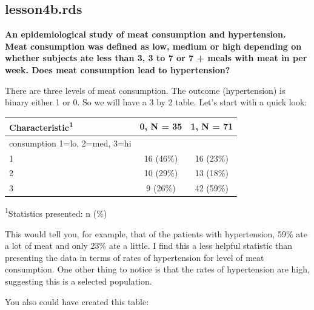 \documentclass[]{book}
\newenvironment{Shaded}{\begin{snugshade}}{\end{snugshade}}
\newcommand{\DataTypeTok}[1]{\textcolor[rgb]{0.13,0.29,0.53}{#1}}
\newcommand{\KeywordTok}[1]{\textcolor[rgb]{0.13,0.29,0.53}{\textbf{#1}}}
\newcommand{\NormalTok}[1]{#1}
\newcommand{\OperatorTok}[1]{\textcolor[rgb]{0.81,0.36,0.00}{\textbf{#1}}}
\newcommand{\StringTok}[1]{\textcolor[rgb]{0.31,0.60,0.02}{#1}}
\begin{document}
\hypertarget{lesson4b.rds}{%
\subsection{lesson4b.rds}\label{lesson4b.rds}}

\textbf{An epidemiological study of meat consumption and hypertension. Meat consumption was defined as low, medium or high depending on whether subjects ate less than 3, 3 to 7 or 7 + meals with meat in per week. Does meat consumption lead to hypertension?}

There are three levels of meat consumption. The outcome (hypertension) is binary either 1 or 0. So we will have a 3 by 2 table. Let's start with a quick look:

\begin{Shaded}
\end{Shaded}

\captionsetup[table]{labelformat=empty,skip=1pt}
\begin{longtable}{lcc}
\toprule
\textbf{Characteristic}\textsuperscript{1} & \textbf{0}, N = 35 & \textbf{1}, N = 71 \\ 
\midrule
consumption 1=lo, 2=med, 3=hi &  &  \\ 
1 & 16 (46\%) & 16 (23\%) \\ 
2 & 10 (29\%) & 13 (18\%) \\ 
3 & 9 (26\%) & 42 (59\%) \\ 
\bottomrule
\end{longtable}
\vspace{-5mm}
\begin{minipage}{\linewidth}
\textsuperscript{1}Statistics presented: n (\%) \\ 
\end{minipage}

This would tell you, for example, that of the patients with hypertension, 59\% ate a lot of meat and only 23\% ate a little. I find this a less helpful statistic than presenting the data in terms of rates of hypertension for level of meat consumption. One other thing to notice is that the rates of hypertension are high, suggesting this is a selected population.

You also could have created this table:
\end{document}

